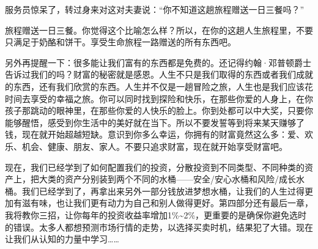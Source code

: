 服务员惊呆了，转过身来对这对夫妻说：“你不知道这趟旅程赠送一日三餐吗？”

旅程赠送一日三餐。你觉得这个比喻怎么样？所以，在你的这趟人生旅程里，不要只满足于奶酪和饼干。享受生命旅程一路赠送的所有东西吧。

另外再提醒一下：很多能让我们富有的东西都是免费的。还记得约翰·邓普顿爵士告诉过我们的吗？财富的秘密就是感恩。人生不只是我们取得的东西或者我们成就的东西，还有我们欣赏的东西。人生并不仅是一趟冒险之旅，人生也是我们应该花时间去享受的幸福之旅。你可以同时找到探险和快乐，在那些你爱的人身上，在你孩子那跳动的眼神里，在那些你爱的人快乐的脸上。你到处都可以中大奖，只要你能够醒悟，感受到你生活中的美好就在当下。所以不要发誓等到将来某天赚够了钱，现在就开始超越短缺。意识到你多么幸运，你拥有的财富竟然这么多：爱、欢乐、机会、健康、朋友、家人。不要只追求财富，现在就开始享受财富吧。

现在，我们已经学到了如何配置我们的投资，分散投资到不同类型、不同种类的资产上，把大类的资产分别装到两个不同的水桶——安全/安心水桶和风险/成长水桶。我们已经学到了，再拿出来另外一部分钱放进梦想水桶，让我们的人生过得更加有滋有味，也让我们更有动力为自己和别人做得更好。第四部分还有最后一章，我将教你三招，让你每年的投资收益率增加1\%\textasciitilde{}2\%，更重要的是确保你避免选时的错误。太多人都想预测市场行情的走势，以选择买卖时机，结果犯了大错。现在让我们从认知的力量中学习……
